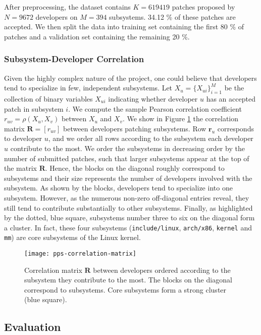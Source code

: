 After preprocessing, the dataset contains $K= \num{619419}$ patches proposed by $ N = \num{9672} $ developers on $M = \num{394}$ subsystems.
34.12 \% of these patches are accepted.
We then split the data into training set containing the first 80 \% of patches and a validation set containing the remaining 20 \%.

\subsubsection{Subsystem-Developer Correlation}

Given the highly complex nature of the project, one could believe that developers tend to specialize in few, independent subsystems.
Let $X_u = \{ X_{ui} \}_{i=1}^M$ be the collection of binary variables $ X_{ui} $ indicating whether developer $u$ has an accepted patch in subsystem $i$.
We compute the sample Pearson correlation coefficient $r_{uv} = \rho(X_u, X_v)$ between $X_u$ and $X_v$.
We show in Figure \ref{fig:linux_correlation} the correlation matrix $ \bm{R} = [r_{uv}] $ between developers patching subsystems.
Row $\bm{r}_u$ corresponds to developer $u$, and we order all rows according to the subsystem each developer $u$ contribute to the most.
We order the subsystems in decreasing order by the number of submitted patches, such that larger subsystems appear at the top of the matrix $\bm{R}$.
Hence, the blocks on the diagonal roughly correspond to subsystems and their size represents the number of developers involved with the subsystem.
As shown by the blocks, developers tend to specialize into one subsystem.
However, as the numerous non-zero off-diagonal entries reveal, they still tend to contribute substantially to other subsystems.
Finally, as highlighted by the dotted, blue square, subsystems number three to six on the diagonal form a cluster.
In fact, these four subsystems (\texttt{include/linux}, \texttt{arch/x86}, \texttt{kernel} and \texttt{mm}) are core subsystems of the Linux kernel.

\begin{figure}
	\texttt{[image: pps-correlation-matrix]}
	\caption{Correlation matrix $ \bm{R} $ between developers ordered according to the subsystem they contribute to the most. The blocks on the diagonal correspond to subsystems.
		Core subsystems form a strong cluster (blue square).}
	\label{fig:linux_correlation}
\end{figure}

\subsection{Evaluation}

